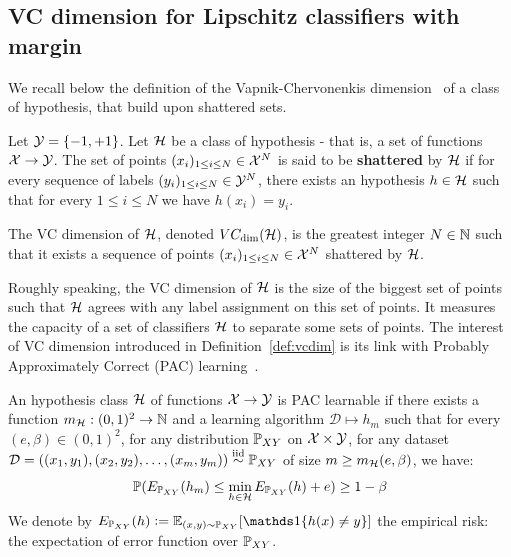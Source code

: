     \subsection{VC dimension for Lipschitz classifiers with margin}\label{app:marginvcbound}
    
    We recall below the definition of the Vapnik-Chervonenkis dimension~\cite{vapnik2015uniform} of a class of hypothesis, that build upon shattered sets.  
    
    \begin{definition}\label{def:shattered}
    Let $\mathcal{Y}=\{-1,+1\}$. Let $\mathcal{H}$ be a class of hypothesis - that is, a set of functions $\mathcal{X}\rightarrow\mathcal{Y}$. The set of points $(x_i)_{1\leq i\leq N}\in\mathcal{X}^N$ is said to be \textbf{shattered} by $\mathcal{H}$ if for every sequence of labels $(y_i)_{1\leq i\leq N}\in\mathcal{Y}^N$, there exists an hypothesis $h\in\mathcal{H}$ such that for every $1\leq i\leq N$ we have $h(x_i)=y_i$.
    \end{definition}
      
    \begin{definition}\label{def:vcdim}
     The VC dimension of $\mathcal{H}$, denoted $VC_{\text{dim}}(\mathcal{H})$, is the greatest integer $N\in\mathbb{N}$ such that it exists a sequence of points $(x_i)_{1\leq i\leq N}\in\mathcal{X}^N$ shattered by $\mathcal{H}$.  
    \end{definition}  
      
    Roughly speaking, the VC dimension of $\mathcal{H}$ is the size of the biggest set of points such that $\mathcal{H}$ agrees with any label assignment on this set of points. It measures the capacity of a set of classifiers $\mathcal{H}$ to separate some sets of points. The interest of VC dimension introduced in Definition~\ref{def:vcdim} is its link with Probably Approximately Correct (PAC) learning~\cite{valiant1984theory}.  
      
    \begin{definition}\label{def:pac}
    An hypothesis class $\mathcal{H}$ of functions $\mathcal{X}\rightarrow\mathcal{Y}$ is PAC learnable if there exists a function $m_{\mathcal{H}}:(0,1)^2\rightarrow\mathbb{N}$ and a learning algorithm $\mathcal{D}\mapsto h_m$ such that for every $(e,\beta)\in(0,1)^2$, for any distribution $\mathbb{P}_{XY}$ on $\mathcal{X}\times\mathcal{Y}$, for any dataset $\mathcal{D}=\left((x_1,y_1),(x_2,y_2),\ldots,(x_m,y_m)\right)\overset{\text{iid}}{\sim}\mathbb{P}_{XY}$ of size $m\geq m_{\mathcal{H}}(e,\beta)$, we have:
    $$\mathbb{P}(E_{\mathbb{P}_{XY}}(h_m)\leq \min_{h\in\mathcal{H}}E_{\mathbb{P}_{XY}}(h)+e)\geq 1-\beta$$
    We denote by $E_{\Prob_{XY}}(h)\defeq\Expect_{(x,y)\sim \Prob_{XY}}[\indicator\{h(x)\neq y\}]$ the empirical risk: the expectation of error function over $\mathbb{P}_{XY}$. 
    \end{definition}
    
